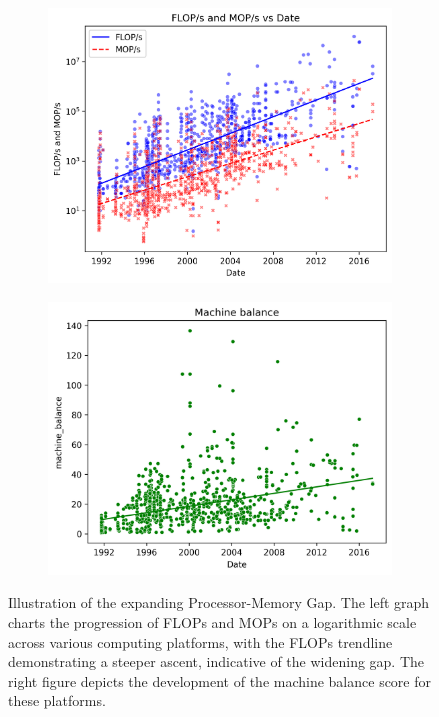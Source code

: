 \begin{figure}
	\begin{subfigure}{.5\textwidth}
		\centering
		\includegraphics[width=\linewidth]{pictures/FLOPs_MOPs_vs_Date.png}
	\end{subfigure}
	\begin{subfigure}{.5\textwidth}
		\centering
		\includegraphics[width=\linewidth]{pictures/machine_balance.png}
	\end{subfigure}
	\caption{Illustration of the expanding Processor-Memory Gap. The left graph charts the progression of FLOPs and MOPs on a logarithmic scale across various computing platforms, with the FLOPs trendline demonstrating a steeper ascent, indicative of the widening gap. The right figure depicts the development of the machine balance score for these platforms.\protect\footnotemark{}}
	\label{fig:pmgap}
\end{figure}

